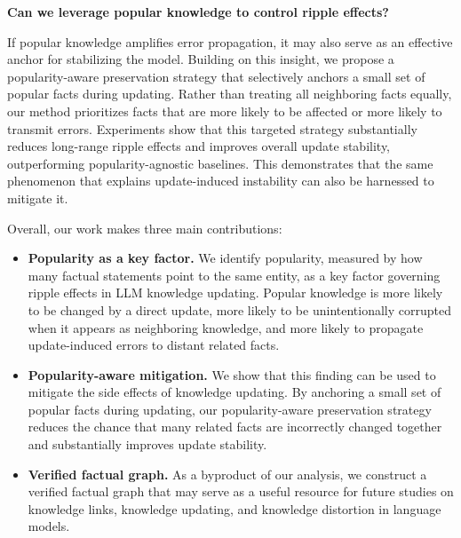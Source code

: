 \textbf{Can we leverage popular knowledge to control ripple effects?}

If popular knowledge amplifies error propagation, it may also serve as an effective anchor for stabilizing the model. 
Building on this insight, we propose a popularity-aware preservation strategy that selectively anchors a small set of popular facts during updating. 
Rather than treating all neighboring facts equally, our method prioritizes facts that are more likely to be affected or more likely to transmit errors. 
Experiments show that this targeted strategy substantially reduces long-range ripple effects and improves overall update stability, outperforming popularity-agnostic baselines. 
This demonstrates that the same phenomenon that explains update-induced instability can also be harnessed to mitigate it.


Overall, our work makes three main contributions:

\begin{itemize}
    \item \textbf{Popularity as a key factor.} We identify popularity, measured by how many factual statements point to the same entity, as a key factor governing ripple effects in LLM knowledge updating. Popular knowledge is more likely to be changed by a direct update, more likely to be unintentionally corrupted when it appears as neighboring knowledge, and more likely to propagate update-induced errors to distant related facts.
    
    \item \textbf{Popularity-aware mitigation.} We show that this finding can be used to mitigate the side effects of knowledge updating. By anchoring a small set of popular facts during updating, our popularity-aware preservation strategy reduces the chance that many related facts are incorrectly changed together and substantially improves update stability.
    
    \item \textbf{Verified factual graph.} As a byproduct of our analysis, we construct a verified factual graph that may serve as a useful resource for future studies on knowledge links, knowledge updating, and knowledge distortion in language models.
\end{itemize}